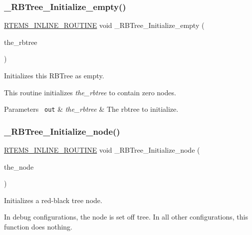 \subsubsection{\texorpdfstring{\_RBTree\_Initialize\_empty()}{\_RBTree\_Initialize\_empty()}}
{\footnotesize\ttfamily \mbox{\hyperlink{group__RTEMSScoreBaseDefs_gac216239df231d5dbd15e3520b0b9313f}{R\+T\+E\+M\+S\+\_\+\+I\+N\+L\+I\+N\+E\+\_\+\+R\+O\+U\+T\+I\+NE}} void \+\_\+\+R\+B\+Tree\+\_\+\+Initialize\+\_\+empty (\begin{DoxyParamCaption}\item[{R\+B\+Tree\+\_\+\+Control $\ast$}]{the\+\_\+rbtree }\end{DoxyParamCaption})}



Initializes this R\+B\+Tree as empty. 

This routine initializes {\itshape the\+\_\+rbtree} to contain zero nodes.


\begin{DoxyParams}[1]{Parameters}
\mbox{\texttt{ out}}  & {\em the\+\_\+rbtree} & The rbtree to initialize. \\
\hline
\end{DoxyParams}
\mbox{\label{group__RTEMSScoreRBTree_gabbc757c2fd03694b6f9bb5aa2be553ff}} 
\subsubsection{\texorpdfstring{\_RBTree\_Initialize\_node()}{\_RBTree\_Initialize\_node()}}
{\footnotesize\ttfamily \mbox{\hyperlink{group__RTEMSScoreBaseDefs_gac216239df231d5dbd15e3520b0b9313f}{R\+T\+E\+M\+S\+\_\+\+I\+N\+L\+I\+N\+E\+\_\+\+R\+O\+U\+T\+I\+NE}} void \+\_\+\+R\+B\+Tree\+\_\+\+Initialize\+\_\+node (\begin{DoxyParamCaption}\item[{\mbox{\hyperlink{structRBTree__Node}{R\+B\+Tree\+\_\+\+Node}} $\ast$}]{the\+\_\+node }\end{DoxyParamCaption})}



Initializes a red-\/black tree node. 

In debug configurations, the node is set off tree. In all other configurations, this function does nothing.


